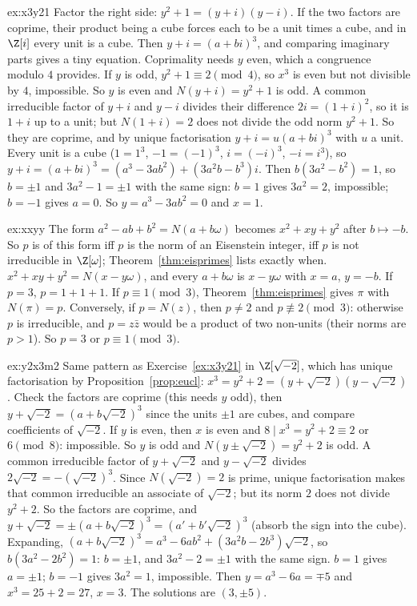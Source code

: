 \begin{solution}{ex:x3y21}
\idea Factor the right side: $y^2+1=(y+i)(y-i)$. If the two factors are coprime, their product being a cube forces each to be a unit times a cube, and in $\Z[i]$ every unit is a cube. Then $y+i=(a+bi)^3$, and comparing imaginary parts gives a tiny equation. Coprimality needs $y$ even, which a congruence modulo $4$ provides.
\writeup If $y$ is odd, $y^2+1\equiv2\pmod4$, so $x^3$ is even but not divisible by $4$, impossible. So $y$ is even and $N(y+i)=y^2+1$ is odd. A common irreducible factor of $y+i$ and $y-i$ divides their difference $2i=(1+i)^2$, so it is $1+i$ up to a unit; but $N(1+i)=2$ does not divide the odd norm $y^2+1$. So they are coprime, and by unique factorisation $y+i=u(a+bi)^3$ with $u$ a unit. Every unit is a cube ($1=1^3$, $-1=(-1)^3$, $i=(-i)^3$, $-i=i^3$), so $y+i=(a+bi)^3=(a^3-3ab^2)+(3a^2b-b^3)i$. Then $b(3a^2-b^2)=1$, so $b=\pm1$ and $3a^2-1=\pm1$ with the same sign: $b=1$ gives $3a^2=2$, impossible; $b=-1$ gives $a=0$. So $y=a^3-3ab^2=0$ and $x=1$.
\end{solution}

\begin{solution}{ex:xxyy}
\idea The form $a^2-ab+b^2=N(a+b\omega)$ becomes $x^2+xy+y^2$ after $b\mapsto-b$. So $p$ is of this form iff $p$ is the norm of an Eisenstein integer, iff $p$ is not irreducible in $\Z[\omega]$; Theorem~\ref{thm:eisprimes} lists exactly when.
\writeup $x^2+xy+y^2=N(x-y\omega)$, and every $a+b\omega$ is $x-y\omega$ with $x=a$, $y=-b$. If $p=3$, $p=1+1+1$. If $p\equiv1\pmod3$, Theorem~\ref{thm:eisprimes} gives $\pi$ with $N(\pi)=p$. Conversely, if $p=N(z)$, then $p\ne2$ and $p\not\equiv2\pmod3$: otherwise $p$ is irreducible, and $p=z\bar z$ would be a product of two non-units (their norms are $p>1$). So $p=3$ or $p\equiv1\pmod3$.
\end{solution}

\begin{solution}{ex:y2x3m2}
\idea Same pattern as Exercise~\ref{ex:x3y21} in $\Z[\sqrt{-2}]$, which has unique factorisation by Proposition~\ref{prop:eucl}: $x^3=y^2+2=(y+\sqrt{-2})(y-\sqrt{-2})$. Check the factors are coprime (this needs $y$ odd), then $y+\sqrt{-2}=(a+b\sqrt{-2})^3$ since the units $\pm1$ are cubes, and compare coefficients of $\sqrt{-2}$.
\writeup If $y$ is even, then $x$ is even and $8\mid x^3=y^2+2\equiv2$ or $6\pmod8$: impossible. So $y$ is odd and $N(y\pm\sqrt{-2})=y^2+2$ is odd. A common irreducible factor of $y+\sqrt{-2}$ and $y-\sqrt{-2}$ divides $2\sqrt{-2}=-(\sqrt{-2})^3$. Since $N(\sqrt{-2})=2$ is prime, unique factorisation makes that common irreducible an associate of $\sqrt{-2}$; but its norm $2$ does not divide $y^2+2$. So the factors are coprime, and $y+\sqrt{-2}=\pm(a+b\sqrt{-2})^3=(a'+b'\sqrt{-2})^3$ (absorb the sign into the cube). Expanding, $(a+b\sqrt{-2})^3=a^3-6ab^2+(3a^2b-2b^3)\sqrt{-2}$, so $b(3a^2-2b^2)=1$: $b=\pm1$, and $3a^2-2=\pm1$ with the same sign. $b=1$ gives $a=\pm1$; $b=-1$ gives $3a^2=1$, impossible. Then $y=a^3-6a=\mp5$ and $x^3=25+2=27$, $x=3$. The solutions are $(3,\pm5)$.
\end{solution}


